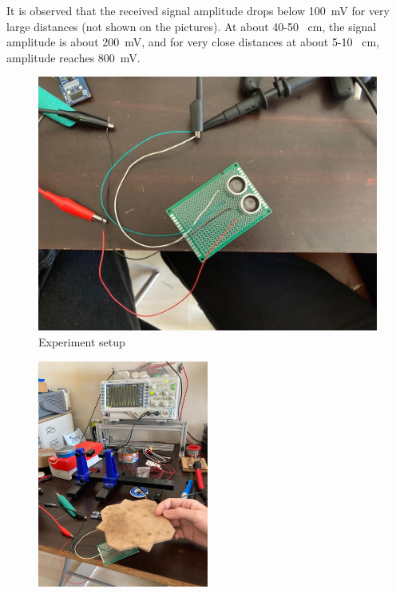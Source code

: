 \documentclass[12pt, a4paper]{article}
\begin{document}
        It is observed that the received signal amplitude drops below \SI{100}{\milli\volt} for very large distances (not shown on the pictures). At about 40-50 \SI{}{\centi\metre}, the signal amplitude is about \SI{200}{\milli\volt}, and for very close distances at about 5-10 \SI{}{\centi\metre}, amplitude reaches \SI{800}{\milli\volt}. 

        \begin{figure}[H]\centering
            \includegraphics[width=\textwidth]{experiment2/setup.jpg}
            \caption[]{Experiment setup}\label{fig:setup}
        \end{figure}

        \begin{figure}[H]\centering
            \includegraphics[width=0.5\textwidth]{experiment2/near.jpg}
            \caption[]{}\label{fig:near}
        \end{figure}
\end{document}
